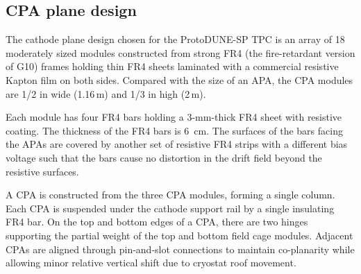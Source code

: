 \subsection{CPA plane design}



The cathode plane design chosen for the ProtoDUNE-SP TPC is an array of 18 moderately sized modules constructed from strong FR4 (the fire-retardant version of G10) frames holding thin FR4 sheets laminated with a commercial resistive Kapton film on both sides.   Compared with the size of an APA, the CPA modules are 1/2 in wide (1.16\,m) and 1/3 in high (2\,m).  

Each module has four FR4 bars holding a 3-mm-thick FR4 sheet with resistive coating.  The thickness of the FR4 bars is 6~cm. 
 The surfaces of the bars facing the APAs are covered by another set of resistive FR4 strips with a different bias voltage such that 
 the bars cause no distortion in the drift field beyond the resistive surfaces.


A CPA is constructed from the three CPA modules, forming a single column.  Each CPA is suspended under the cathode support rail by a single insulating FR4 bar.  On the top and bottom edges of a CPA, there are two hinges supporting the partial weight of the top and bottom field cage modules.   Adjacent CPAs are aligned through pin-and-slot connections to maintain co-planarity while allowing minor relative vertical shift due to cryostat roof movement.

